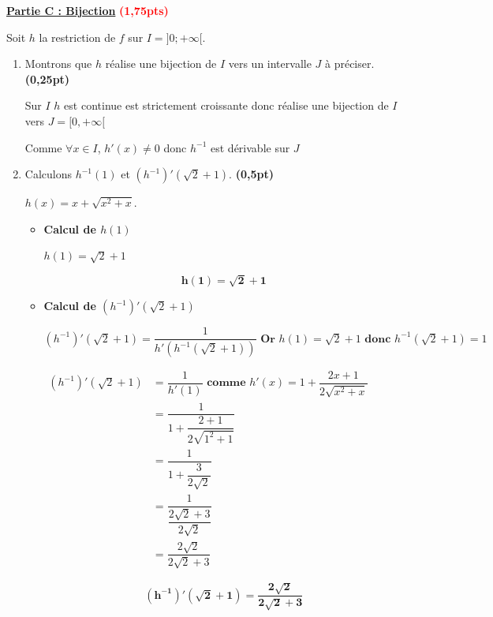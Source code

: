 \documentclass[12pt,a4paper]{article}
\begin{document}
\underline{\textbf{Partie C : Bijection}} \textcolor{red}{\textbf{(1,75pts)}}

Soit $h$ la restriction de $f$ sur $I = ]0; +\infty[$.
\begin{enumerate}
    \item Montrons que $h$ réalise une bijection de $I$ vers un intervalle $J$ à préciser. \textbf{(0,25pt)}

Sur $I$ $h$ est continue est strictement croissante donc réalise une bijection de $I$ vers $J=[0,+\infty[$

		Comme $\forall x \in I$, $h'(x)\neq 0$ donc $h^{-1}$ est dérivable sur $J$    
    
    \item Calculons $h^{-1}(1)$ et $(h^{-1})'(\sqrt{2}+1)$. \textbf{(0,5pt)}

\(
h(x)=x+\sqrt{x^2+x}.
\)

\begin{itemize}

\item  \textbf{ Calcul de $h(1)$}

$h(1) = \sqrt{2}+1$ 

\begin{resultbox}
    \[
        \mathbf{ h(1) = \sqrt{2}+1 }
    \]
\end{resultbox} 

\item  \textbf{ Calcul de $(h^{-1})'(\sqrt{2}+1)$}

\(
(h^{-1})'(\sqrt{2}+1)=\dfrac{1}{h'(h^{-1}(\sqrt{2}+1))} \textbf{ Or } h(1) = \sqrt{2}+1 \textbf{ donc } h^{-1}(\sqrt{2}+1) = 1
\)

\(
\begin{aligned}
(h^{-1})'(\sqrt{2}+1)
&= \dfrac{1}{h'\!\left(1\right)} \textbf{ comme } h'(x)=1+\dfrac{2x+1}{2\sqrt{x^2+x}}\\
&=\dfrac{1}{1+\dfrac{2+1}{2\sqrt{1^2+1}}}\\
&=\dfrac{1}{1+\dfrac{3}{2\sqrt{2}}}\\
&=\dfrac{1}{ \dfrac{2\sqrt{2}+3}{2\sqrt{2}}}\\
&=\dfrac{2\sqrt{2}}{2\sqrt{2}+3}
\end{aligned}
\)

\begin{resultbox}
    \[
        \mathbf{(h^{-1})'(\sqrt{2}+1)=\dfrac{2\sqrt{2}}{2\sqrt{2}+3}}
    \]
\end{resultbox}  
\end{itemize}   
    

\end{enumerate}
\end{document}
